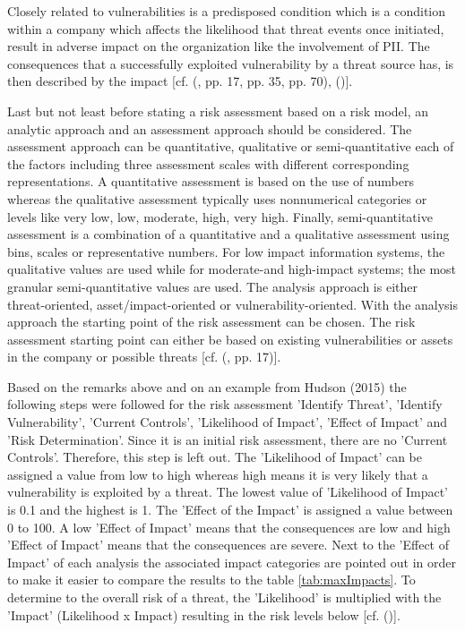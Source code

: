 Closely related to vulnerabilities is a predisposed condition which is a condition within a company which affects the likelihood that threat events once initiated, result in adverse impact on the organization like the involvement of PII. The consequences that a successfully exploited vulnerability by a threat source has, is then described by the impact  [cf. (\cite{NIST:2012:GCRA}, pp. 17, pp. 35, pp. 70), (\cite{NIST:2017:SecurityNPrivacyControls})].

Last but not least before stating a risk assessment based on a risk model, an analytic approach and an assessment approach should be considered. The assessment approach can be quantitative, qualitative or semi-quantitative each of the factors including three assessment scales with different corresponding representations. A quantitative assessment is based on the use of numbers whereas the qualitative assessment typically uses nonnumerical categories or levels like very low, low, moderate, high, very high. Finally, semi-quantitative assessment is a combination of a quantitative and a qualitative assessment using bins, scales or representative numbers. For low impact information systems, the qualitative values are used while for moderate-and high-impact systems; the most granular semi-quantitative values are used. The analysis approach is either threat-oriented, asset/impact-oriented or vulnerability-oriented. With the analysis approach the starting point of the risk assessment can be chosen. The risk assessment starting point can either be based on existing vulnerabilities or assets in the company or possible threats  [cf. (\cite{NIST:2012:GCRA}, pp. 17)].

 Based on the remarks above and on an example from Hudson (2015) the following steps were followed for the risk assessment  'Identify Threat', 'Identify Vulnerability', 'Current Controls', 'Likelihood of Impact', 'Effect of Impact' and 'Risk Determination'. Since it is an initial risk assessment, there are no 'Current Controls'. Therefore, this step is left out. The 'Likelihood of Impact' can be assigned a value from low to high whereas high means it is very likely that a vulnerability is exploited by a threat. The lowest value of 'Likelihood of Impact' is 0.1 and the highest is 1. The 'Effect of the Impact' is assigned a value between 0 to 100. A low 'Effect of Impact' means that the consequences are low and high 'Effect of Impact' means that the consequences are severe. Next to the 'Effect of Impact' of each analysis the associated impact categories are pointed out in order to make it easier to compare the results to the table \ref{tab:maxImpacts}. To determine to the overall risk of a threat, the 'Likelihood' is multiplied with the 'Impact' (Likelihood x Impact) resulting in the risk levels below [cf. (\cite{Hudson:2015:SecurityRisk})]. 

